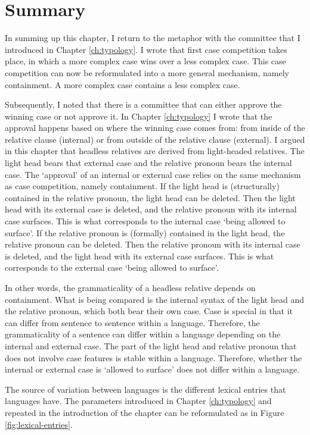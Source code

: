 \section{Summary}

In summing up this chapter, I return to the metaphor with the committee that I introduced in Chapter \ref{ch:typology}. I wrote that first case competition takes place, in which a more complex case wins over a less complex case. This case competition can now be reformulated into a more general mechanism, namely containment. A more complex case contains a less complex case.

Subsequently, I noted that there is a committee that can either approve the winning case or not approve it. In Chapter \ref{ch:typology} I wrote that the approval happens based on where the winning case comes from: from inside of the relative clause (internal) or from outside of the relative clause (external). I argued in this chapter that headless relatives are derived from light-headed relatives. The light head bears that external case and the relative pronoun bears the internal case. The `approval' of an internal or external case relies on the same mechanism as case competition, namely containment.
If the light head is (structurally) contained in the relative pronoun, the light head can be deleted. Then the light head with its external case is deleted, and the relative pronoun with its internal case surfaces. This is what corresponds to the internal case `being allowed to surface'.
If the relative pronoun is (formally) contained in the light head, the relative pronoun can be deleted. Then the relative pronoun with its internal case is deleted, and the light head with its external case surfaces. This is what corresponds to the external case `being allowed to surface'.

In other words, the grammaticality of a headless relative depends on containment. What is being compared is the internal syntax of the light head and the relative pronoun, which both bear their own case. Case is special in that it can differ from sentence to sentence within a language. Therefore, the grammaticality of a sentence can differ within a language depending on the internal and external case. The part of the light head and relative pronoun that does not involve case features is stable within a language. Therefore, whether the internal or external case is `allowed to surface' does not differ within a language.

The source of variation between languages is the different lexical entries that languages have. The parameters introduced in Chapter \ref{ch:typology} and repeated in the introduction of the chapter can be reformulated as in Figure \ref{fig:lexical-entries}.

